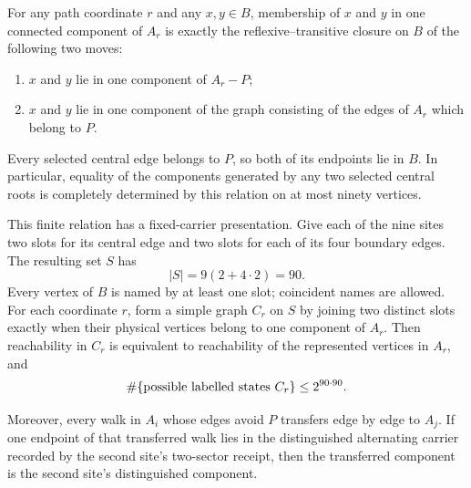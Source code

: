 \begin{corollary}
For any path coordinate $r$ and any $x,y\in B$, membership of $x$ and $y$ in
one connected component of $A_r$ is exactly the reflexive--transitive closure
on $B$ of the following two moves:
\begin{enumerate}
  \item $x$ and $y$ lie in one component of $A_r-P$;
  \item $x$ and $y$ lie in one component of the graph consisting of the
        edges of $A_r$ which belong to $P$.
\end{enumerate}
Every selected central edge belongs to $P$, so both of its endpoints lie in
$B$.  In particular, equality of the components generated by any two
selected central roots is completely determined by this relation on at most
ninety vertices.

This finite relation has a fixed-carrier presentation.  Give each of the nine
sites two slots for its central edge and two slots for each of its four
boundary edges.  The resulting set $S$ has
\[
                       |S|=9(2+4\cdot2)=90.
\]
Every vertex of $B$ is named by at least one slot; coincident names are
allowed.  For each coordinate $r$, form a simple graph $C_r$ on $S$ by
joining two distinct slots exactly when their physical vertices belong to
one component of $A_r$.  Then reachability in $C_r$ is equivalent to
reachability of the represented vertices in $A_r$, and
\[
              \#\{\hbox{possible labelled states }C_r\}
                    \leq 2^{90\cdot90}.
\]

Moreover, every walk in $A_i$ whose edges avoid $P$ transfers edge by edge to
$A_j$.  If one endpoint of that transferred walk lies in the distinguished
alternating carrier recorded by the second site's two-sector receipt, then
the transferred component is the second site's distinguished component.
\end{corollary}

